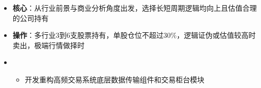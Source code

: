   \begin{itemize}[leftmargin=*]
    \item \textbf{核心}：从行业前景与商业分析角度出发，选择长短周期逻辑均向上且估值合理的公司持有
    \item \textbf{操作}：多行业3到6支股票持有，单股仓位不超过30\%，逻辑证伪或估值较高时卖出，极端行情做择时
    \item
    {\small
    \begin{itemize}
      \item 开发重构高频交易系统底层数据传输组件和交易柜台模块
    \end{itemize}
    }
  \end{itemize}